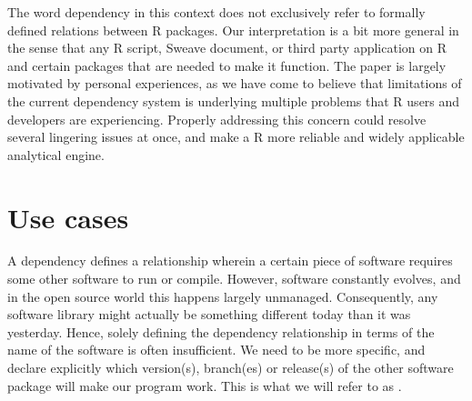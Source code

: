 The word dependency in this context does not exclusively refer to formally
defined relations between R packages. Our interpretation is a bit more general in
the sense that any R script, Sweave document, or third party application
 on R and certain packages that are needed to make it function.
The paper is largely motivated by personal experiences, as we have come to
believe that limitations of the current dependency system is underlying
multiple problems that R users and developers are experiencing. Properly
addressing this concern could resolve several lingering issues at once,
and make a R more reliable and widely applicable analytical engine.




%
%
%













\section{Use cases}

A dependency defines a relationship wherein a certain piece of software requires
some other software to run or compile. However, software constantly evolves, and in
the open source world this happens largely unmanaged. Consequently, any software
library might actually be something different today than it was yesterday.
Hence, solely defining the dependency relationship in terms of the name of the
software is often insufficient. We need to be more specific, and declare
explicitly which version(s), branch(es) or release(s) of the other software
package will make our program work. This is what we will refer to as
.

